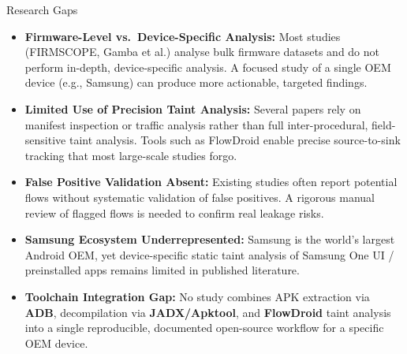\documentclass[aspectratio=169]{beamer}
\begin{document}
\begin{frame}{Research Gaps}
\begin{itemize}
    \item \textbf{Firmware-Level vs.\ Device-Specific Analysis:}
          Most studies (FIRMSCOPE, Gamba et al.) analyse bulk firmware datasets and do not
          perform in-depth, device-specific analysis. A focused study of a single OEM device
          (e.g., Samsung) can produce more actionable, targeted findings.

    \item \textbf{Limited Use of Precision Taint Analysis:}
          Several papers rely on manifest inspection or traffic analysis rather than full
          inter-procedural, field-sensitive taint analysis. Tools such as FlowDroid enable
          precise source-to-sink tracking that most large-scale studies forgo.

    \item \textbf{False Positive Validation Absent:}
          Existing studies often report potential flows without systematic validation of false
          positives. A rigorous manual review of flagged flows is needed to confirm real leakage risks.

    \item \textbf{Samsung Ecosystem Underrepresented:}
          Samsung is the world's largest Android OEM, yet device-specific static taint analysis
          of Samsung One UI / preinstalled apps remains limited in published literature.

    \item \textbf{Toolchain Integration Gap:}
          No study combines APK extraction via \textbf{ADB}, decompilation via
          \textbf{JADX/Apktool}, and \textbf{FlowDroid} taint analysis into a single
          reproducible, documented open-source workflow for a specific OEM device.
\end{itemize}
\end{frame}
\end{document}

